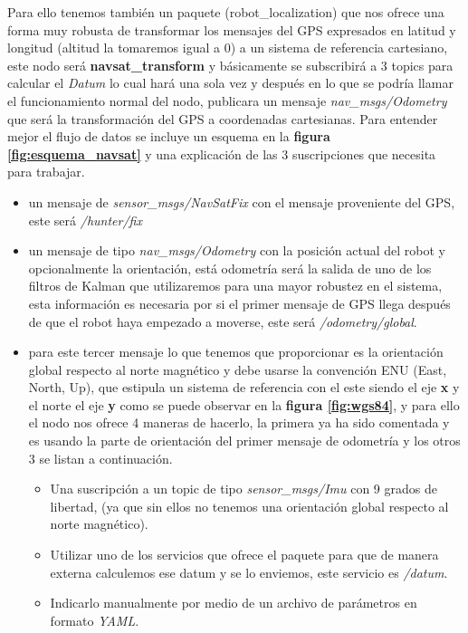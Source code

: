 Para ello tenemos también un paquete (robot\_localization) que nos 
ofrece una forma muy robusta de transformar los mensajes del GPS expresados en latitud y longitud (altitud la tomaremos igual a 0) a un 
sistema de referencia cartesiano, este nodo será \textbf{navsat\_transform} y básicamente se subscribirá a 3 topics para calcular 
el \textit{Datum} lo cual hará una sola vez y después en lo que se podría llamar el funcionamiento normal del nodo, publicara un mensaje 
\textit{nav\_msgs/Odometry} que será la transformación del GPS a coordenadas cartesianas. Para entender mejor el flujo de datos se incluye 
un esquema en la \textbf{figura \ref{fig:esquema_navsat}} y una explicación de las 3 suscripciones que necesita para trabajar.

\begin{itemize}
    \item un mensaje de \textit{sensor\_msgs/NavSatFix} con el mensaje proveniente del GPS, este será \textit{/hunter/fix}
    \item un mensaje de tipo \textit{nav\_msgs/Odometry} con la posición actual del robot y opcionalmente la orientación, está odometría 
será la salida de uno de los filtros de Kalman que utilizaremos para una mayor robustez en el sistema, esta información es necesaria por 
si el primer mensaje de GPS llega después de que el robot haya empezado a moverse, este será \textit{/odometry/global}.
    \item para este tercer mensaje lo que tenemos que proporcionar es la orientación global respecto al norte magnético y debe usarse la 
convención ENU (East, North, Up), que estipula un sistema de referencia con el este siendo el eje \textbf{x} y el norte el eje \textbf{y} 
como se puede observar en la \textbf{figura \ref{fig:wgs84}}, y para ello el nodo nos ofrece 4 maneras de hacerlo, la primera ya ha sido 
comentada y es usando la parte de orientación del primer mensaje de odometría y los otros 3 se listan a continuación.
        \begin{itemize}
            \item Una suscripción a un topic de tipo \textit{sensor\_msgs/Imu} con 9 grados de libertad, (ya que sin ellos no tenemos una 
orientación global respecto al norte magnético).
            \item Utilizar uno de los servicios que ofrece el paquete para que de manera externa calculemos ese datum y se lo enviemos, 
este servicio es \textit{/datum}.
            \item Indicarlo manualmente por medio de un archivo de parámetros en formato \textit{YAML}.
        \end{itemize}
\end{itemize}



